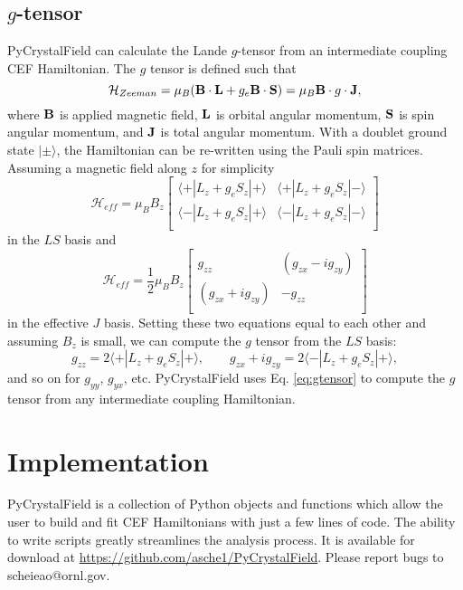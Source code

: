 \documentclass[twocolumn,english,prb]{revtex4-2}
\begin{document}
\subsection{$g$-tensor}

PyCrystalField can calculate the Lande $g$-tensor from an intermediate coupling CEF Hamiltonian. 
The $g$ tensor is defined such that 
\begin{equation}
\mathcal{H}_{Zeeman} = \mu_B ({\bf B} \cdot {\bf L} + g_e  {\bf B} \cdot {\bf S}) = \mu_B {\bf B} \cdot g \cdot {\bf J},
\end{equation} 
where ${\bf B}$ is applied magnetic field, $\bf L$ is orbital angular momentum, $\bf S$ is spin angular momentum, and $\bf J$ is total angular momentum. With a doublet ground state $|\pm \rangle$, the Hamiltonian can be re-written using the Pauli spin matrices. Assuming a magnetic field along $z$ for simplicity
$$
\mathcal{H}_{eff} = \mu_B B_z \begin{bmatrix}
\langle + | L_z + g_e S_z | + \rangle & \langle + | L_z + g_e S_z | - \rangle \\
\langle - | L_z + g_e S_z | + \rangle & \langle - | L_z + g_e S_z | - \rangle \\
\end{bmatrix}
$$
in the $LS$ basis and
$$
\mathcal{H}_{eff} = \frac{1}{2} \mu_B B_z \begin{bmatrix}
g_{zz} & (g_{zx} - i g_{zy}) \\
(g_{zx} + i g_{zy}) & - g_{zz} \\
\end{bmatrix}
$$
in the effective $J$ basis. Setting these two equations equal to each other and assuming $B_z$ is small, we can compute the $g$ tensor from the $LS$ basis:
\begin{equation}
g_{zz}= 2 \langle + | L_{z} + g_e S_{z} |+ \rangle, \quad \quad g_{zx} + i g_{zy}=2 \langle - | L_{z} + g_e S_{z} |+ \rangle,
\label{eq:gtensor}
\end{equation}
and so on for $g_{yy}$, $g_{yx}$, etc.  PyCrystalField uses Eq. \ref{eq:gtensor} to compute the $g$ tensor from any intermediate coupling Hamiltonian.

\section{Implementation}

PyCrystalField is a collection of Python objects and functions which allow the user to build and fit CEF Hamiltonians with just a few lines of code. The ability to write scripts greatly streamlines the analysis process. It is available for download at \url{https://github.com/asche1/PyCrystalField}.
Please report bugs to scheieao@ornl.gov.
\end{document}
